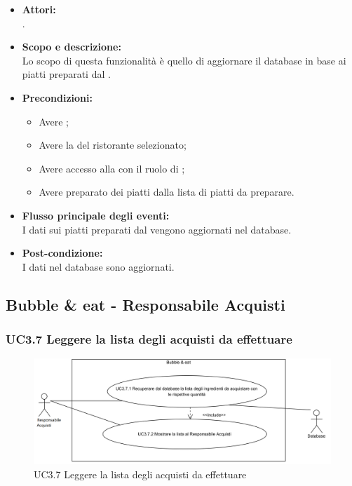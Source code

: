 \begin{itemize}
	\item \textbf{Attori:}
	\\.
	\item \textbf{Scopo e descrizione:} 
	\\Lo scopo di questa funzionalità è quello di aggiornare il database in base ai piatti preparati dal .
	\item \textbf{Precondizioni:}
	\begin{itemize}
		\item Avere ;
		\item Avere la  del ristorante selezionato;
		\item Avere accesso alla  con il ruolo di ;
		\item Avere preparato dei piatti dalla lista di piatti da preparare.
	\end{itemize}
	\item \textbf{Flusso principale degli eventi:}
	\\I dati sui piatti preparati dal  vengono aggiornati nel database.
	\item \textbf{Post-condizione:}
	\\I dati nel database sono aggiornati.
\end{itemize}

\subsection{Bubble \& eat - Responsabile Acquisti}

\subsubsection{UC3.7 Leggere la lista degli acquisti da effettuare} \label{UC3.7}

\begin{figure}[H]
	\centering
	\includegraphics[width=15cm]{../../documenti/AnalisiDeiRequisiti/Diagrammi_img/uc3_7.png}
	\caption{UC3.7 Leggere la lista degli acquisti da effettuare}
\end{figure}

